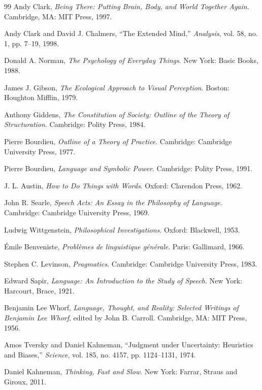 \documentclass[11pt,oneside]{book}
\theoremstyle{definition}
\theoremstyle{remark}
\begin{document}
\begin{thebibliography}{99}
 Andy Clark, \emph{Being There: Putting Brain, Body, and World Together Again}. Cambridge, MA:
  MIT Press, 1997.

 Andy Clark and David J. Chalmers, ``The Extended Mind,'' \emph{Analysis}, vol. 58, no. 1, pp.
  7--19, 1998.

 Donald A. Norman, \emph{The Psychology of Everyday Things}. New York: Basic Books, 1988.

 James J. Gibson, \emph{The Ecological Approach to Visual Perception}. Boston: Houghton Mifflin,
  1979.

 Anthony Giddens, \emph{The Constitution of Society: Outline of the Theory of Structuration}.
  Cambridge: Polity Press, 1984.

 Pierre Bourdieu, \emph{Outline of a Theory of Practice}. Cambridge: Cambridge University Press,
  1977.

 Pierre Bourdieu, \emph{Language and Symbolic Power}. Cambridge: Polity Press, 1991.

 J. L. Austin, \emph{How to Do Things with Words}. Oxford: Clarendon Press, 1962.

 John R. Searle, \emph{Speech Acts: An Essay in the Philosophy of Language}. Cambridge: Cambridge
  University Press, 1969.

 Ludwig Wittgenstein, \emph{Philosophical Investigations}. Oxford: Blackwell, 1953.

 \'Emile Benveniste, \emph{Probl\`emes de linguistique g\'en\'erale}. Paris: Gallimard, 1966.

 Stephen C. Levinson, \emph{Pragmatics}. Cambridge: Cambridge University Press, 1983.

 Edward Sapir, \emph{Language: An Introduction to the Study of Speech}. New York: Harcourt,
  Brace, 1921.

 Benjamin Lee Whorf, \emph{Language, Thought, and Reality: Selected Writings of Benjamin Lee
  Whorf}, edited by John B. Carroll. Cambridge, MA: MIT Press, 1956.

 Amos Tversky and Daniel Kahneman, ``Judgment under Uncertainty: Heuristics and Biases,''
  \emph{Science}, vol. 185, no. 4157, pp. 1124--1131, 1974.

 Daniel Kahneman, \emph{Thinking, Fast and Slow}. New York: Farrar, Straus and Giroux, 2011.


\end{thebibliography}
\end{document}
